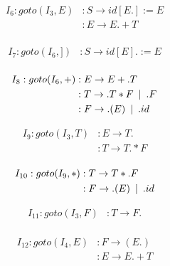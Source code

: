 \documentclass{article}
\newcommand\tab[1][5pt]{\hspace*{#1}}
\newcommand\sep{\tab | \tab }
\begin{document}
\begin{figure}[h!]
\begin{multicols}{2}
\begin{equation*}
\begin{aligned}
I_6 : goto(I_3,E) &: S \rightarrow id[E.] :=E  \\
&: E \rightarrow E.+T \\
\end{aligned}
\end{equation*}

\begin{equation*}
\begin{aligned}
I_7 : goto(I_6,]) &: S \rightarrow id[E]. :=E  \\
\end{aligned}
\end{equation*}

\begin{equation*}
\begin{aligned}
I_8 : goto(I_6,+) &: E \rightarrow E+.T  \\
&: T \rightarrow .T*F \tab | \tab  .F \\
&: F \rightarrow .(E) \sep .id \\
\end{aligned}
\end{equation*}


\begin{equation*}
\begin{aligned}
I_9 : goto(I_3,T) &: E \rightarrow T.  \\
&: T \rightarrow T.*F  \\
\end{aligned}
\end{equation*}

\begin{equation*}
\begin{aligned}
I_{10} : goto(I_9,*) &: T \rightarrow T*.F  \\
&: F \rightarrow .(E) \sep .id
\end{aligned}
\end{equation*}


\begin{equation*}
\begin{aligned}
I_{11} : goto(I_3,F) &: T \rightarrow F.  \\
\end{aligned}
\end{equation*}


\begin{equation*}
\begin{aligned}
I_{12} : goto(I_4,E) &: F \rightarrow (E.)  \\
&: E \rightarrow E.+T 
\end{aligned}
\end{equation*}



\end{multicols}
\end{figure}
\end{document}
